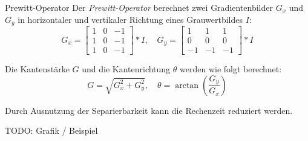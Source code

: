 \begin{defi}[Kantendetektor]{Prewitt-Operator}
    Der \emph{Prewitt-Operator} berechnet zwei Gradientenbilder $G_x$ und $G_y$ in horizontaler und vertikaler Richtung eines Grauwertbildes $I$:
    \[
        G_x = \begin{bmatrix}
            1 & 0 & -1 \\
            1 & 0 & -1 \\
            1 & 0 & -1
        \end{bmatrix}
        \ast I
        , \quad
        G_y = \begin{bmatrix}
            1  & 1  & 1  \\
            0  & 0  & 0  \\
            -1 & -1 & -1
        \end{bmatrix}
        \ast I
    \]

    Die Kantenstärke $G$ und die Kantenrichtung $\theta$ werden wie folgt berechnet:
    \[
        G = \sqrt{G_x^2 + G_y^2}, \quad \theta = \arctan \left( \frac{G_y}{G_x} \right)
    \]

    Durch Ausnutzung der Separierbarkeit kann die Rechenzeit reduziert werden.

    TODO: Grafik / Beispiel
\end{defi}

